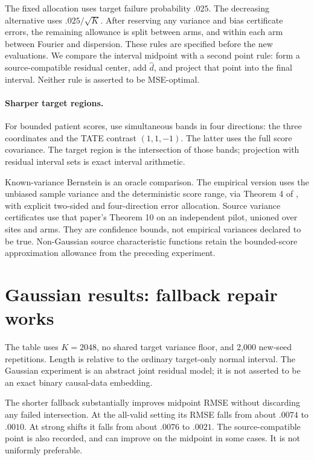 \documentclass[11pt]{article}
\begin{document}
The fixed allocation uses target failure probability $.025$. The decreasing
alternative uses $.025/\sqrt K$. After reserving any variance and bias
certificate errors, the remaining allowance is split between arms, and
within each arm between Fourier and dispersion. These rules are specified
before the new evaluations. We compare the interval midpoint with a second
point rule: form a source-compatible residual center, add $\widehat d$, and
project that point into the final interval. Neither rule is asserted to be
MSE-optimal.

\paragraph{Sharper target regions.}
For bounded patient scores, use simultaneous bands in four directions:
the three coordinates and the TATE contrast $(1,1,-1)$. The latter uses the
full score covariance. The target region is the intersection of those bands;
projection with residual interval sets is exact interval arithmetic.

Known-variance Bernstein is an oracle comparison. The empirical version
uses the unbiased sample variance and the deterministic score range, via
Theorem 4 of \citet{maurer2009}, with explicit two-sided and four-direction
error allocation. Source variance certificates use that paper's Theorem 10
on an independent pilot, unioned over sites and arms. They are confidence
bounds, not empirical variances declared to be true. Non-Gaussian source
characteristic functions retain the bounded-score approximation allowance
from the preceding experiment.

\section{Gaussian results: fallback repair works}

The table uses $K=2048$, no shared target variance floor, and 2,000 new-seed
repetitions. Length is relative to the ordinary target-only normal interval.
The Gaussian experiment is an abstract joint residual model; it is not
asserted to be an exact binary causal-data embedding.

\begin{center}\small
\resizebox{\linewidth}{!}{}
\end{center}

The shorter fallback substantially improves midpoint RMSE without discarding
any failed intersection. At the all-valid setting its RMSE falls from about
$.0074$ to $.0010$. At strong shifts it falls from about $.0076$ to $.0021$.
The source-compatible point is also recorded, and can improve on the midpoint
in some cases. It is not uniformly preferable.
\end{document}
